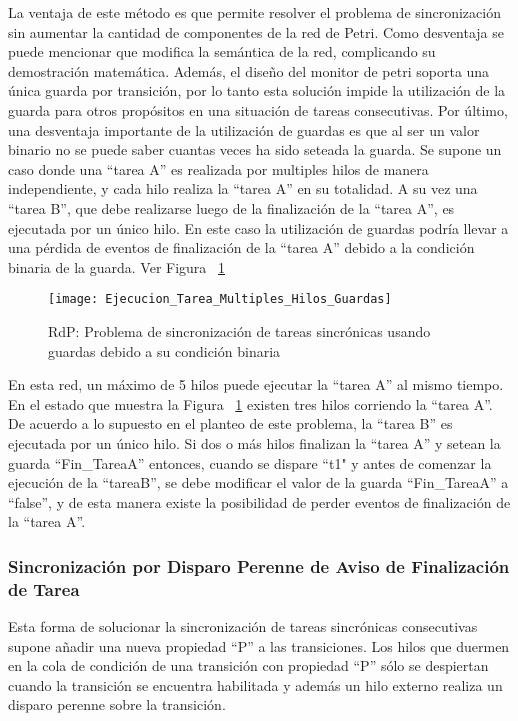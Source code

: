 La ventaja de este método es que permite resolver el problema de sincronización
sin aumentar la cantidad de componentes de la red de Petri.
Como desventaja se puede mencionar que modifica la semántica de la
red, complicando su demostración matemática. Además, el diseño del monitor de
petri soporta una única guarda por transición, por lo tanto esta solución impide
la utilización de la guarda para otros propósitos en una situación de tareas
consecutivas. Por último, una desventaja importante de la utilización de guardas
es que al ser un valor binario no se puede saber cuantas veces ha sido seteada
la guarda.
Se supone un caso donde una ``tarea A'' es realizada por multiples hilos de manera
independiente, y cada hilo realiza la ``tarea A'' en su totalidad. A su
vez una ``tarea B'', que debe realizarse luego de la finalización de la ``tarea
A'', es ejecutada por un único hilo. En este caso la utilización de guardas
podría llevar a una pérdida de eventos de finalización de la ``tarea A'' debido
a la condición binaria de la guarda. Ver Figura ~\ref{fig:ejecucion_multiples_hilos_guardas}

\begin{figure}[H]
    \centering
    \texttt{[image: Ejecucion\_Tarea\_Multiples\_Hilos\_Guardas]}
    \caption{RdP: Problema de sincronización de tareas sincrónicas usando
    guardas debido a su condición binaria}
    \label{fig:ejecucion_multiples_hilos_guardas}
\end{figure}

En esta red, un máximo de 5 hilos puede ejecutar la ``tarea A'' al mismo
tiempo. En el estado que  muestra la Figura
~\ref{fig:ejecucion_multiples_hilos_guardas} existen tres hilos corriendo la
``tarea A''. De acuerdo a lo supuesto en el planteo de este problema, la ``tarea
B'' es ejecutada por un único hilo. Si dos o más hilos finalizan la ``tarea A''
y setean la guarda ``Fin\_TareaA'' entonces, cuando se dispare ``t1" y antes de
comenzar la ejecución de la ``tareaB'', se debe modificar el valor de la guarda
``Fin\_TareaA'' a ``false'', y de esta manera existe la posibilidad de perder
eventos de finalización de la ``tarea A''.

\subsubsection{Sincronización por Disparo Perenne de Aviso de
Finalización de Tarea}
Esta forma de solucionar la sincronización de tareas sincrónicas consecutivas
supone añadir una nueva propiedad ``P'' a las transiciones. Los hilos que
duermen en la cola de condición de una transición con propiedad ``P'' sólo
se despiertan cuando la transición se encuentra habilitada y además un hilo
externo realiza un disparo perenne sobre la transición.

